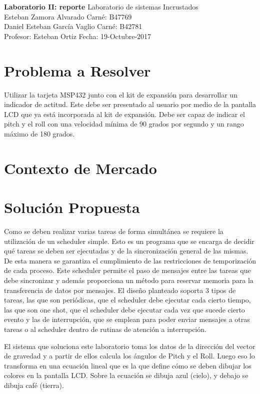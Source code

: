 

\noindent
\large\textbf{Laboratorio II: reporte} \hfill Laboratorio de sistemas Incrustados \\
\normalsize Esteban Zamora Alvarado \hfill Carné: B47769 \\
Daniel Esteban García Vaglio \hfill Carné: B42781 \\
Profesor: Esteban Ortiz  \hfill Fecha: 19-Octubre-2017 \\

\section{Problema a Resolver}

Utilizar la tarjeta MSP432 junto con el kit de expansión para desarrollar un
indicador de actitud. Este debe ser presentado al usuario por medio de la
pantalla LCD que ya está incorporada al kit de expansión. Debe ser capaz de
indicar el pitch y el roll con una velocidad mínima de 90 grados por segundo y
un rango máximo de 180 grados.

\section{Contexto de Mercado}


\section{Solución Propuesta}

Como se deben realizar varias tareas de forma simultánea se requiere la
utilización de un scheduler simple. Esto es un programa que se encarga de
decidir qué tareas se deben ser ejecutadas y de la sincronización general de las
mismas. De esta manera se garantiza el cumplimiento de las restricciones de
temporización de cada proceso. Este scheduler permite el paso de mensajes entre
las tareas que debe sincronizar y además proporciona un método para reservar
memoria para la transferencia de datos por mensajes. El diseño planteado soporta
3 tipos de tareas, las que son periódicas, que el scheduler debe ejecutar cada
cierto tiempo, las que son one shot, que el scheduler debe ejecutar cada vez
que sucede cierto evento y las de interrupción, que se emplean para poder enviar
mensajes a otras tareas o al scheduler dentro de rutinas de atención a interrupción.

El sistema que soluciona este laboratorio toma los datos de la dirección del
vector de gravedad y a partir de ellos calcula los ángulos de Pitch y el Roll.
Luego eso lo transforma en una ecuación lineal que es la que define cómo se
deben dibujar los colores en la pantalla LCD. Sobre la ecuación se dibuja azul
(cielo), y debajo se dibuja café (tierra).

